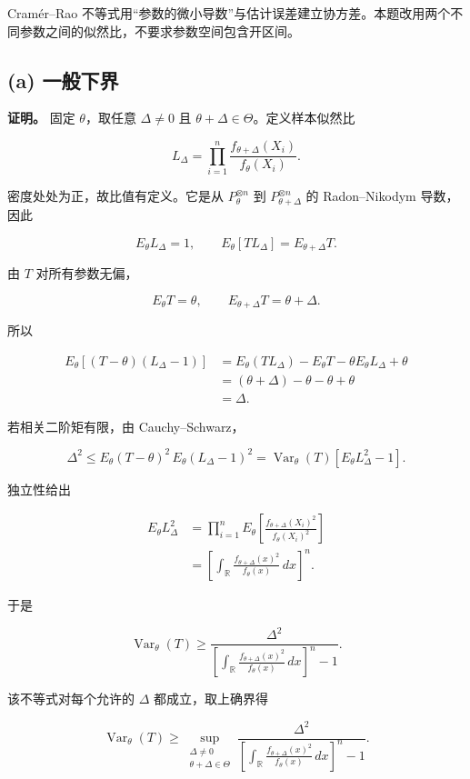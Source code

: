  Cramér--Rao 不等式用“参数的微小导数”与估计误差建立协方差。本题改用两个不同参数之间的似然比，不要求参数空间包含开区间。

\subsection{(a) 一般下界}

\textbf{证明。} 固定 $\theta$，取任意 $\Delta\ne0$ 且 $\theta+\Delta\in\Theta$。定义样本似然比

\[
L_\Delta
=\prod_{i=1}^n
\frac{f_{\theta+\Delta}(X_i)}{f_\theta(X_i)}.
\]

密度处处为正，故比值有定义。它是从 $P_\theta^{\otimes n}$ 到 $P_{\theta+\Delta}^{\otimes n}$ 的 Radon--Nikodym 导数，因此

\[
E_\theta L_\Delta=1,\qquad
E_\theta[T L_\Delta]=E_{\theta+\Delta}T.
\]

由 $T$ 对所有参数无偏，

\[
E_\theta T=\theta,\qquad
E_{\theta+\Delta}T=\theta+\Delta.
\]

所以

\[
\begin{aligned}
E_\theta[(T-\theta)(L_\Delta-1)]
&=E_\theta(TL_\Delta)-E_\theta T
-\theta E_\theta L_\Delta+\theta\\
&=(\theta+\Delta)-\theta-\theta+\theta\\
&=\Delta.
\end{aligned}
\]

若相关二阶矩有限，由 Cauchy--Schwarz，

\[
\Delta^2
\le E_\theta(T-\theta)^2\,E_\theta(L_\Delta-1)^2
=\operatorname{Var}_\theta(T)[E_\theta L_\Delta^2-1].
\]

独立性给出

\[
\begin{aligned}
E_\theta L_\Delta^2
&=\prod_{i=1}^n
E_\theta\left[
\frac{f_{\theta+\Delta}(X_i)^2}{f_\theta(X_i)^2}
\right]\\
&=\left[
\int_{\mathbb R}
\frac{f_{\theta+\Delta}(x)^2}{f_\theta(x)}\,dx
\right]^n.
\end{aligned}
\]

于是

\[
\operatorname{Var}_\theta(T)
\ge
\frac{\Delta^2}{
\left[\displaystyle\int_{\mathbb R}
\frac{f_{\theta+\Delta}(x)^2}{f_\theta(x)}\,dx\right]^n-1}.
\]

该不等式对每个允许的 $\Delta$ 都成立，取上确界得

\[
\boxed{
\operatorname{Var}_\theta(T)\ge
\sup_{\substack{\Delta\ne0\\\theta+\Delta\in\Theta}}
\frac{\Delta^2}{
\left[\displaystyle\int_{\mathbb R}
\frac{f_{\theta+\Delta}(x)^2}{f_\theta(x)}\,dx\right]^n-1}.}
\]

